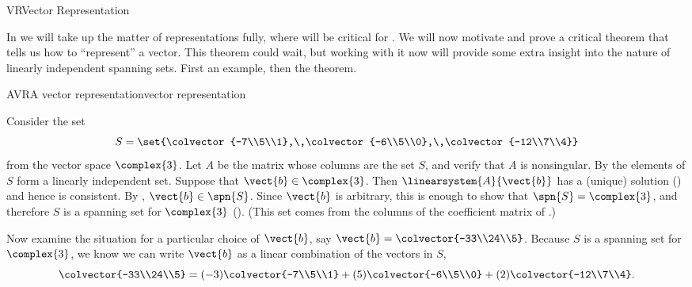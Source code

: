 \begin{subsect}{VR}{Vector Representation}
%
\begin{para}In  we will take up the matter of representations fully, where  will be critical for .  We will now motivate and prove a critical theorem that tells us how to ``represent'' a vector.   This theorem could wait, but working with it now will provide some extra insight into the nature of linearly independent spanning sets.  First an example, then the theorem.\end{para}
%
%
\begin{example}{AVR}{A vector representation}{vector representation}
\begin{para}Consider the set
%
\begin{equation*}
S=\set{\colvector{-7\\5\\1},\,\colvector{-6\\5\\0},\,\colvector{-12\\7\\4}}
\end{equation*}
%
from the vector space $\complex{3}$.  Let $A$ be the matrix whose columns are the set $S$, and verify that $A$ is nonsingular.  By  the elements of $S$ form a linearly independent set.  Suppose that $\vect{b}\in\complex{3}$.  Then $\linearsystem{A}{\vect{b}}$ has a (unique) solution () and hence is consistent.  By , $\vect{b}\in\spn{S}$.  Since $\vect{b}$ is arbitrary, this is enough to show that $\spn{S}=\complex{3}$, and therefore $S$ is a spanning set for $\complex{3}$ ().  (This set comes from the columns of the coefficient matrix of .)\end{para}
%
\begin{para}Now examine the situation for a particular choice of $\vect{b}$, say $\vect{b}=\colvector{-33\\24\\5}$.  Because $S$ is a spanning set for $\complex{3}$, we know we can write $\vect{b}$ as a linear combination of the vectors in $S$,
%
\begin{equation*}
\colvector{-33\\24\\5}=
(-3)\colvector{-7\\5\\1}+(5)\colvector{-6\\5\\0}+(2)\colvector{-12\\7\\4}.

\end{equation*}
\end{para}
\end{example}
\end{subsect}

